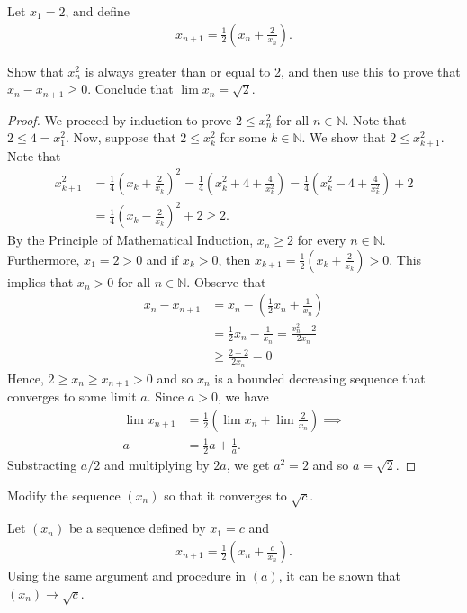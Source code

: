 \documentclass[12pt]{article}
\newcommand{\N}{\mathbb{N}}
\newenvironment{problem}[2][Problem]{\begin{trivlist} \item[\hskip \labelsep {\bfseries #1}\hskip \labelsep {\bfseries #2.}]}{\end{trivlist}}
\newenvironment{solution}[1][Solution]{\begin{trivlist} \item[\hskip \labelsep {\bfseries #1}]}{\end{trivlist}}
\begin{document}
\begin{problem}{2.4.5 (Calculating Square Roots)}
  Let $x_{1}=2$, and define
\begin{align*}
  x_{n+1} = \frac{1}{2} \left( x_{n}+\frac{2}{x_{n}} \right).
\end{align*}
\begin{enumerate}
  \item Show that $x_{n}^{2}$ is always greater than or equal to 2, and then use this to prove that $x_{n}-x_{n+1} \geq 0$. Conclude that $\lim x_{n} = \sqrt{2}$.
\begin{proof}
  We proceed by induction to prove $2\leq x_{n}^{2}$ for all $n\in\N$. Note that $2\leq 4 = x_{1}^{2}$. Now, suppose that $2\leq x_{k}^{2}$ for some $k\in \N$. We show that $2\leq x_{k+1}^{2}$. Note that
\begin{align*}
  x_{k+1}^{2} &= \frac{1}{4}\left( x_{k}+\frac{2}{x_{k}} \right)^{2} = \frac{1}{4}\left( x_{k}^{2}+4+\frac{4}{x_{k}^{2}} \right) = \frac{1}{4}\left( x_{k}^{2}-4+\frac{4}{x_{k}^{2}} \right) + 2\\  &=\frac{1}{4}\left( x_{k}-\frac{2}{x_{k}} \right)^{2} + 2 \geq 2.
\end{align*}
By the Principle of Mathematical Induction, $x_{n}\geq 2$ for every $n\in \N$.\\
Furthermore, $x_{1} = 2 > 0$ and if $x_{k} > 0$, then $x_{k+1} = \frac{1}{2}\left( x_{k}+\frac{2}{x_{k}} \right)>0$. This implies that $x_{n} >0$ for all $n\in \N$. Observe that  
\begin{align*}
  x_{n}-x_{n+1} &= x_{n} - \left( \frac{1}{2}x_{n}+\frac{1}{x_{n}} \right)\\
  &= \frac{1}{2}x_{n} -\frac{1}{x_{n}} = \frac{x_{n}^{2}-2}{2x_{n}}\\
  &\geq \frac{2-2}{2x_{n}} = 0
\end{align*}
Hence, $2\geq x_{n}\geq x_{n+1}>0$ and so $x_{n}$ is a bounded decreasing sequence that converges to some limit $a$. Since $a>0$, we have
\begin{align*}
  \lim x_{n+1} &= \frac{1}{2}\left( \lim x_{n} + \lim \frac{2}{x_{n}} \right) \implies\\
  a &= \frac{1}{2}a +\frac{1}{a}.
\end{align*}
Substracting $a/2$ and multiplying by $2a$, we get $a^{2}=2$ and so $a=\sqrt{2}$.
\end{proof}
  \item Modify the sequence $(x_{n})$ so that it converges to $\sqrt{c}$.
\begin{solution}
  Let $(x_{n})$ be a sequence defined by $x_{1}=c$ and
\begin{align*}
  x_{n+1} = \frac{1}{2}\left( x_{n}+\frac{c}{x_{n}} \right).
\end{align*}
Using the same argument and procedure in $(a)$, it can be shown that $(x_{n})\to \sqrt{c}$.
\end{solution}
\end{enumerate}
\end{problem}
\end{document}
